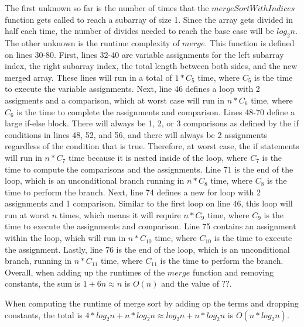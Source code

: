 \documentclass[letterpaper, 10pt,DIV=13]{scrartcl}
\numberwithin{equation}{section} %
\numberwithin{figure}{section} %
\numberwithin{table}{section} %
\begin{document}
The first unknown so far is the number of times that the $mergeSortWithIndices$ function gets called to reach a subarray of size 1. Since the array gets divided in half each time, the number of divides needed to reach the base case will be $log_2n$. The other unknown is the runtime complexity of $merge$. This function is defined on lines 30-80. First, lines 32-40 are variable assignments for the left subarray index, the right subarray index, the total length between both sides, and the new merged array. These lines will run in a total of $1 * C_{5}$ time, where $C_{5}$ is the time to execute the variable assignments. Next, line 46 defines a loop with 2 assigments and a comparison, which at worst case will run in $n * C_{6}$ time, where $C_{6}$ is the time to complete the assignments and comparison. Lines 48-70 define a large if-else block. There will always be 1, 2, or 3 comparisons as defined by the if conditions in lines 48, 52, and 56, and there will always be 2 assignments regardless of the condition that is true. Therefore, at worst case, the if statements will run in $n * C_{7}$ time because it is nested inside of the loop, where $C_{7}$ is the time to compute the comparisons and the assignments. Line 71 is the end of the loop, which is an unconditional branch running in $n * C_{8}$ time, where $C_{8}$ is the time to perform the branch. Next, line 74 defines a new for loop with 2 assignments and 1 comparison. Similar to the first loop on line 46, this loop will run at worst $n$ times, which means it will require $n * C_{9}$ time, where $C_{9}$ is the time to execute the assignments and comparison. Line 75 contains an assignment within the loop, which will run in $n * C_{10}$ time, where $C_{10}$ is the time to execute the assignment. Lastly, line 76 is the end of the loop, which is an unconditional branch, running in $n * C_{11}$ time, where $C_{11}$ is the time to perform the branch. Overall, when adding up the runtimes of the $merge$ function and removing constants, the sum is $1 + 6n \approx n$ is $O(n)$ and the value of $??$.

When computing the runtime of merge sort by adding op the terms and dropping constants, the total is $4 * log_2n + n * log_2n \approx log_2n + n * log_2n$ is $O(n * log_2n)$.
\end{document}
